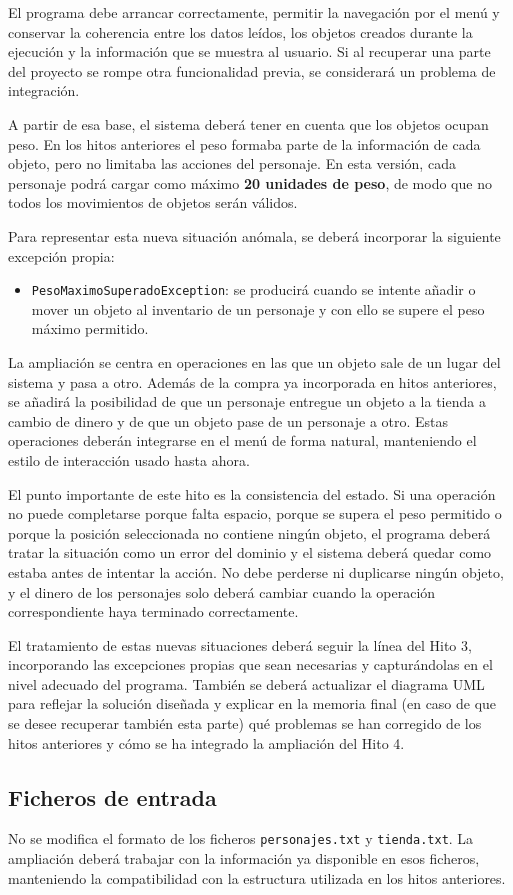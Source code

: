 \documentclass[11pt,a4paper]{article}
\begin{document}
El programa debe arrancar correctamente, permitir la navegación por el menú y conservar la coherencia entre los datos leídos, los objetos creados durante la ejecución y la información que se muestra al usuario. Si al recuperar una parte del proyecto se rompe otra funcionalidad previa, se considerará un problema de integración.

A partir de esa base, el sistema deberá tener en cuenta que los objetos ocupan peso. En los hitos anteriores el peso formaba parte de la información de cada objeto, pero no limitaba las acciones del personaje. En esta versión, cada personaje podrá cargar como máximo \textbf{20 unidades de peso}, de modo que no todos los movimientos de objetos serán válidos.

Para representar esta nueva situación anómala, se deberá incorporar la siguiente excepción propia:
\begin{itemize}
    \item \texttt{PesoMaximoSuperadoException}: se producirá cuando se intente añadir o mover un objeto al inventario de un personaje y con ello se supere el peso máximo permitido.
\end{itemize}

La ampliación se centra en operaciones en las que un objeto sale de un lugar del sistema y pasa a otro. Además de la compra ya incorporada en hitos anteriores, se añadirá la posibilidad de que un personaje entregue un objeto a la tienda a cambio de dinero y de que un objeto pase de un personaje a otro. Estas operaciones deberán integrarse en el menú de forma natural, manteniendo el estilo de interacción usado hasta ahora.

El punto importante de este hito es la consistencia del estado. Si una operación no puede completarse porque falta espacio, porque se supera el peso permitido o porque la posición seleccionada no contiene ningún objeto, el programa deberá tratar la situación como un error del dominio y el sistema deberá quedar como estaba antes de intentar la acción. No debe perderse ni duplicarse ningún objeto, y el dinero de los personajes solo deberá cambiar cuando la operación correspondiente haya terminado correctamente.

El tratamiento de estas nuevas situaciones deberá seguir la línea del Hito 3, incorporando las excepciones propias que sean necesarias y capturándolas en el nivel adecuado del programa. También se deberá actualizar el diagrama UML para reflejar la solución diseñada y explicar en la memoria final (en caso de que se desee recuperar también esta parte) qué problemas se han corregido de los hitos anteriores y cómo se ha integrado la ampliación del Hito 4.

\subsection{Ficheros de entrada}

No se modifica el formato de los ficheros \texttt{personajes.txt} y \texttt{tienda.txt}. La ampliación deberá trabajar con la información ya disponible en esos ficheros, manteniendo la compatibilidad con la estructura utilizada en los hitos anteriores.
\end{document}
